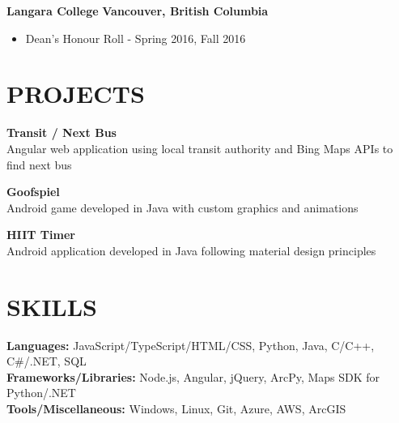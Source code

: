 \documentclass[margin,line]{resume}
\begin{document}
\begin{resume}
    \textbf{\listing Langara College} \hfill \textbf{Vancouver, British Columbia} \vspace{2mm}\\
    \begin{itemize}[noitemsep,topsep=3pt,before=\textsl{Associate of Science (Computer Science)} \hfill \textsl{January 2015 -- December 2017}\vspace{-3mm}\\\vspace{-1mm},after=\vspace{\medskipamount}]
    \item Dean’s Honour Roll - Spring 2016, Fall 2016
    \end{itemize}

    \vspace{-1mm}

\sectionline

    \section{\mysidestyle \textbf{\large{P}\small{ROJECTS}}}
    
    \textbf{Transit / Next Bus} \vspace{2mm}\\
    Angular web application using local transit authority and Bing Maps APIs to find next bus

    \textbf{Goofspiel} \vspace{2mm}\\
    Android game developed in Java with custom graphics and animations
    
    \textbf{HIIT Timer} \vspace{2mm}\\
    Android application developed in Java following material design principles

    \vspace{-1mm}

\sectionline

    \section{\mysidestyle \textbf{\large{S}\small{KILLS}}}

    \textbf{Languages:} JavaScript/TypeScript/HTML/CSS, Python, Java, C/C++, C\#/.NET, SQL\\
    \textbf{Frameworks/Libraries:} Node.js, Angular, jQuery, ArcPy, Maps SDK for Python/.NET\\
    \textbf{Tools/Miscellaneous:} Windows, Linux, Git, Azure, AWS, ArcGIS


\end{resume}
\end{document}
